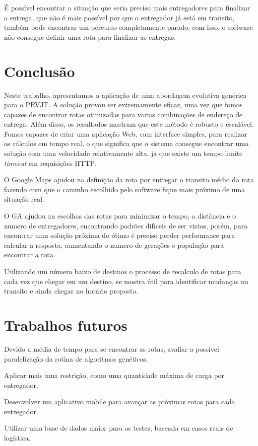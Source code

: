 É possível encontrar a situação que seria preciso mais entregadores para finalizar a entrega, que não é mais possível por que o entregador já está em transito, também pode encontrar um percurso completamente parado,  com isso, o software não consegue definir uma rota para finalizar as entregas.


\section{Conclusão}

Neste trabalho, apresentamos a aplicação de uma abordagem evolutiva genérica para o PRVJT. A solução provou ser extremamente eficaz, uma vez que fomos capazes de encontrar rotas otimizadas para varias combinações de endereço de entrega. Além disso, os resultados mostram que este método é robusto e escalável. 
Fomos capazes de criar uma aplicação Web, com interface simples, para realizar os cálculos em tempo real, o que significa que o sistema consegue encontrar uma solução com uma velocidade relativamente alta, ja que existe um tempo limite \textit{timeout} em requisições HTTP.

O Google Maps ajudou na definição da rota por entregar o transito médio da rota fazendo com que o caminho escolhido pelo software fique mais próximo de uma situação real. 

O GA ajudou na escolhas das rotas para minimizar o tempo, a distância e o numero de entregadores, encontrando padrões difíceis de ser vistos, porém, para encontrar uma solução próxima do ótimo é preciso perder performance para calcular a resposta, aumentando o numero de gerações e população para encontrar a rota.

Utilizando um número baixo de destinos o processo de recalculo de rotas para cada vez que chegar em um  destino, se mostra útil para identificar mudanças no transito e ainda chegar no horário proposto.

\section{Trabalhos futuros}

Devido a média de tempo para se encontrar as rotas, avaliar a possível paralelização da rotina de algoritmos genéticos.

Aplicar mais uma restrição, como uma quantidade máxima de carga por entregador.

Desenvolver um aplicativo mobile para avançar as próximas rotas para cada entregador.

Utilizar uma base de dados maior para os testes, baseada em casos reais de logística.